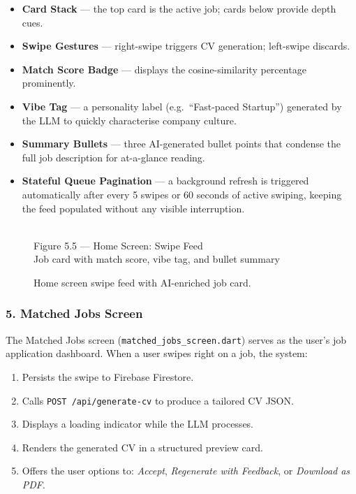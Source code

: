 \documentclass[12pt, a4paper, oneside]{report}
\newcommand{\placeholder}[1]{%
  \begin{tcolorbox}[
    colback  = lightgray,
    colframe = coderule,
    fontupper= \small\ttfamily\color{gray},
    halign   = center,
    valign   = center,
    height   = 6cm,
    sharp corners
  ]
    [IMAGE PLACEHOLDER]\\[4pt]#1
  \end{tcolorbox}%
}
\begin{document}
\begin{itemize}[itemsep=3pt]
  \item \textbf{Card Stack} — the top card is the active job; cards below provide depth cues.
  \item \textbf{Swipe Gestures} — right-swipe triggers CV generation; left-swipe discards.
  \item \textbf{Match Score Badge} — displays the cosine-similarity percentage prominently.
  \item \textbf{Vibe Tag} — a personality label (e.g.\ ``Fast-paced Startup'') generated
        by the LLM to quickly characterise company culture.
  \item \textbf{Summary Bullets} — three AI-generated bullet points that condense the full
        job description for at-a-glance reading.
  \item \textbf{Stateful Queue Pagination} — a background refresh is triggered automatically
        after every 5 swipes or 60 seconds of active swiping, keeping the feed populated
        without any visible interruption.
\end{itemize}

\begin{figure}[H]
  \centering
  \placeholder{Figure 5.5 — Home Screen: Swipe Feed\\Job card with match score, vibe tag, and bullet summary}
  \caption{Home screen swipe feed with AI-enriched job card.}
  \label{fig:homescreen}
\end{figure}

\subsubsection*{5. Matched Jobs Screen}

The Matched Jobs screen (\texttt{matched\_jobs\_screen.dart}) serves as the user's job
application dashboard. When a user swipes right on a job, the system:
\begin{enumerate}[label=\arabic*., itemsep=2pt]
  \item Persists the swipe to Firebase Firestore.
  \item Calls \texttt{POST /api/generate-cv} to produce a tailored CV JSON.
  \item Displays a loading indicator while the LLM processes.
  \item Renders the generated CV in a structured preview card.
  \item Offers the user options to: \emph{Accept}, \emph{Regenerate with Feedback}, or
        \emph{Download as PDF}.
\end{enumerate}
\end{document}
